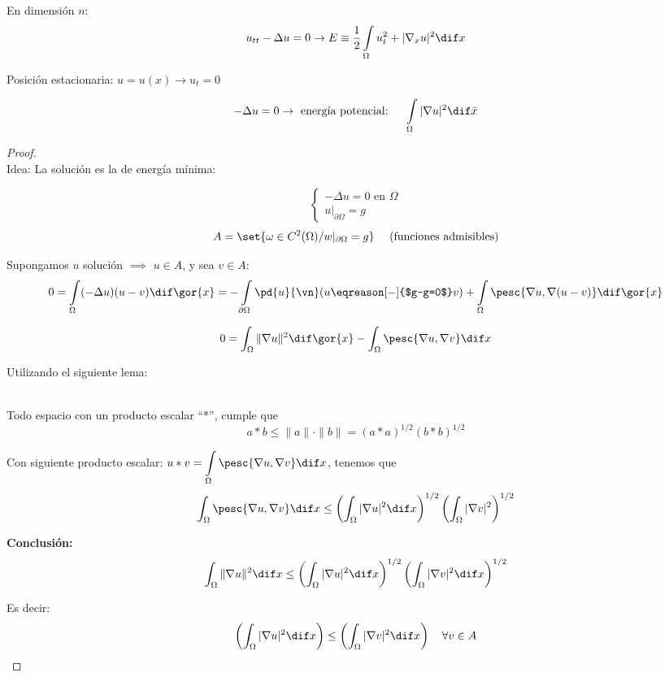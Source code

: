		En dimensión $n$:
		\[ u_{tt}- \Delta u = 0 \rightarrow E \equiv \frac{1}{2}\int\limits_\Omega u^2_t + | \nabla_x u |^2 \dif x \]

		Posición estacionaria: $u = u(x) \rightarrow u_t = 0$

		\[ - \Delta u = 0 \rightarrow \text{ energía potencial: }\quad \int\limits_\Omega | \nabla u|^2 \dif\bar{x} \]

		\begin{proof} $ $\\ %
		Idea: La solución es la de energía mínima:

		\[ \begin{cases}
			-\Delta u = 0 \text{ en } \Omega \\
			u|_{\partial\Omega} = g
		\end{cases}\]
		\[ A = \set{ \omega \in C^2(\Omega) / w |_{\partial \Omega} = g } \quad \text{ (funciones admisibles)}\]

		\proofpart{$\implies$}

		Supongamos $u$ solución $\implies$ $u \in A$, y sea $v \in A$:
		\[ 0 = \int\limits_\Omega (-\Delta u)(u-v) \dif\gor{x} = - \int\limits_{\partial\Omega} \pd{u}{\vn} (u \eqreason[-]{$g-g=0$}v) + \int\limits_\Omega \pesc{\nabla u, \nabla (u-v)} \dif\gor{x} \]

		\[ 0 = \int_\Omega \|\nabla u\|^2 \dif\gor{x} - \int_\Omega \pesc{\nabla u, \nabla v} \dif x \]

		Utilizando el siguiente lema:
		\begin{lemma} $ $ \\ %
			Todo espacio con un producto escalar ``*'', cumple que
			\[ a * b \leq \|a\| \cdot \|b\| = (a*a)^{1/2} (b*b)^{1/2} \]
		\end{lemma}

		Con siguiente producto escalar: $\displaystyle u * v = \int\limits_{\Omega} \pesc{\nabla u, \nabla v} \dif x $, tenemos que
		\[ \int_\Omega \pesc{\nabla u, \nabla v} \dif x \leq \left( \int_\Omega |\nabla u|^2 \dif x \right)^{1/2} \left( \int_\Omega |\nabla v|^2 \right)^{1/2} \]

		\textbf{Conclusión:}
		\[ \int_\Omega \| \nabla u \|^2 \dif x \leq \left( \int_\Omega |\nabla u|^2 \dif x \right)^{1/2} \left( \int_\Omega |\nabla v|^2 \dif x \right)^{1/2} \]

		Es decir:
		\[ \left( \int_\Omega |\nabla u|^2 \dif x \right) \leq \left( \int_\Omega |\nabla v|^2 \dif x \right) \quad \forall v \in A \]


\end{proof}
